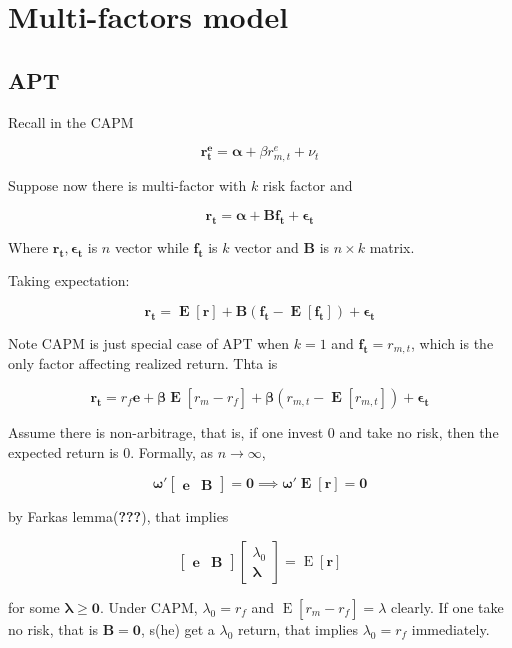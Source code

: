 \documentclass{article}
\begin{document}
\hypertarget{multi-factors-model}{%
\section{Multi-factors model}\label{multi-factors-model}}

\hypertarget{apt}{%
\subsection{APT}\label{apt}}

Recall in the CAPM

\[ \bm{\mathbf{r_t^e=\alpha}}+{\beta r_{m,t}^e+\nu_t} \]

Suppose now there is multi-factor with \(k\) risk factor and

\[ \bm{\mathbf{r_t=\alpha+Bf_t+\epsilon_t}} \]

Where \(\bm{\mathbf{r_t,\epsilon_t}}\) is \(n\) vector while
\(\bm{\mathbf{f_t}}\) is \(k\) vector and \(\bm{\mathbf{B}}\) is
\(n\times k\) matrix.

Taking expectation:

\[ \bm{\mathbf{r_t=\mathop{\text{E}}[r]+B(f_t-\mathop{\text{E}}[f_t])+\epsilon_t}} \]

Note CAPM is just special case of APT when \(k=1\) and
\(\bm{\mathbf{f_t}}=r_{m,t}\), which is the only factor affecting
realized return. Thta is

\[ \bm{\mathbf{r_t=\mathit{r_f}e+\beta \mathop{\text{E}}[\mathit{r_{m}-r_f}]+\beta(\mathit{r_{m,t}}-\mathop{\text{E}}[\mathit{r_{m,t}}])+\epsilon_t}} \]

Assume there is non-arbitrage, that is, if one invest \(0\) and take no
risk, then the expected return is \(0\). Formally, as \(n\to \infty\),

\[ \bm{\mathbf{\omega'\begin{bmatrix}
  \bm{\mathbf{e}}&\bm{\mathbf{B}}
\end{bmatrix}=0\implies\omega'\mathop{\text{E}}[r]=0}} \]

by Farkas lemma({\textbf{???}}), that implies

\[ \begin{bmatrix}
  \bm{\mathbf{e}}&\bm{\mathbf{B}}
\end{bmatrix}\begin{bmatrix}
  \lambda_0\\\bm{\mathbf{\lambda}}
\end{bmatrix}=\mathop{\text{E}}[\bm{\mathbf{r}}] \]

for some \(\bm{\mathbf{\lambda\ge 0}}\). Under CAPM, \(\lambda_0=r_f\)
and \(\mathop{\text{E}}[\mathit{r_{m}-r_f}]=\lambda\) clearly. If one
take no risk, that is \(\bm{\mathbf{B=0}}\), s(he) get a \(\lambda_0\)
return, that implies \(\lambda_0=r_f\) immediately.
\end{document}
